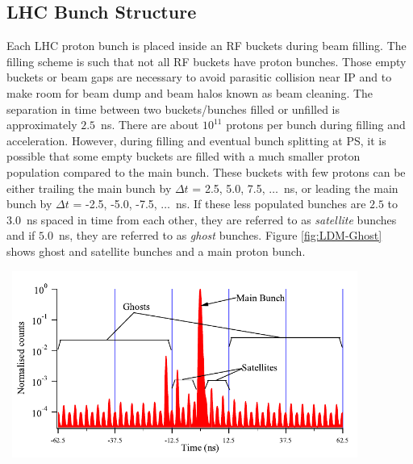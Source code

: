 \subsection{LHC Bunch Structure}
Each LHC proton bunch is placed inside an RF buckets during beam filling. %
The filling scheme is such that not all RF buckets have proton bunches. 
Those empty buckets or beam gaps are necessary to avoid parasitic collision near IP and to make room for beam dump and beam halos known as beam cleaning.%
The separation in time between two buckets/bunches filled or unfilled is approximately $2.5$~ns. There are  about $10^{11}$ protons per bunch during filling and acceleration.
However, during filling and eventual bunch splitting at PS, it is possible that some empty buckets are filled with a much smaller proton population compared to the main bunch. These buckets with few protons can be either trailing the main bunch by $\Delta t$ = 2.5, 5.0, 7.5, $\ldots$~ns, or leading the main bunch by $\Delta t$ = -2.5, -5.0, -7.5, $\ldots$~ns. If these less populated bunches are $2.5$ to $3.0$~ns spaced in time from each other, they are referred to as \textit{satellite} bunches and if $5.0$~ns, they are referred to as \textit{ghost} bunches. Figure \ref{fig:LDM-Ghost} shows ghost and satellite bunches and a main proton bunch.
\begin{center}
\centering
\mbox{
\includegraphics[height=0.5\textwidth, width=0.85\textwidth]{THESISPLOTS/Ghost-Satellite-Bunches-LDM.png}} 
\label{fig:LDM-Ghost}
\end{center}
